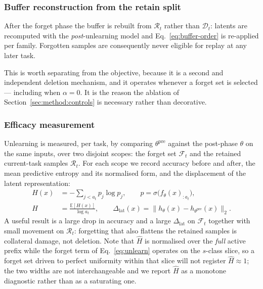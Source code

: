 \subsubsection{Buffer reconstruction from the retain split}
\label{sec:method:rebuild}

After the forget phase the buffer is rebuilt from $\mathcal{R}_t$ rather than
$\mathcal{D}_t$: latents are recomputed with the \emph{post}-unlearning model and
Eq.~\eqref{eq:buffer-order} is re-applied per family. Forgotten samples are
consequently never eligible for replay at any later task.

This is worth separating from the objective, because it is a second and
independent deletion mechanism, and it operates whenever a forget set is selected
--- including when $\alpha = 0$. It is the reason the ablation of
Section~\ref{sec:method:controls} is necessary rather than decorative.

\subsubsection{Efficacy measurement}
\label{sec:method:efficacy}

Unlearning is measured, per task, by comparing $\theta^{\text{pre}}$ against the
post-phase $\theta$ on the same inputs, over two disjoint scopes: the forget set
$\mathcal{F}_t$ and the retained current-task samples $\mathcal{R}_t$. For each
scope we record accuracy before and after, the mean predictive entropy and its
normalised form, and the displacement of the latent representation:
\begin{align}
  \label{eq:efficacy}
  H(x) &= -\!\!\sum_{j < a_t} p_j \log p_j,
  \qquad p = \sigma\big(f_{\theta}(x)_{:a_t}\big), \\
  \widehat{H} &= \frac{\mathbb{E}[H(x)]}{\log a_t},
  \qquad
  \Delta_{\text{lat}}(x) = \big\| h_{\theta}(x) - h_{\theta^{\text{pre}}}(x) \big\|_2 .
\end{align}
A useful result is a large drop in accuracy and a large $\Delta_{\text{lat}}$ on
$\mathcal{F}_t$ together with small movement on $\mathcal{R}_t$: forgetting that
also flattens the retained samples is collateral damage, not deletion. Note that
$\widehat{H}$ is normalised over the \emph{full} active prefix while the forget
term of Eq.~\eqref{eq:unlearn} operates on the $s$-class slice, so a forget set
driven to perfect uniformity within that slice will not register
$\widehat{H} \approx 1$; the two widths are not interchangeable and we report
$\widehat{H}$ as a monotone diagnostic rather than as a saturating one.

